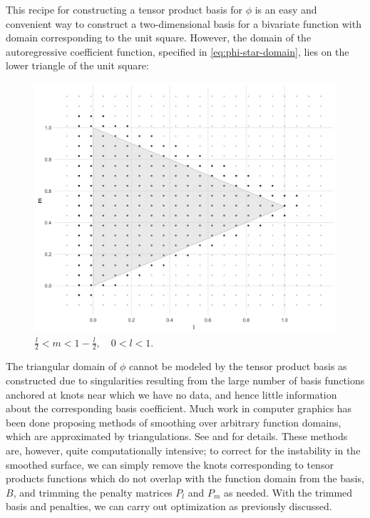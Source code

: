 \documentclass[12pt]{article}
\theoremstyle{definition}
\begin{document}
This recipe for constructing a tensor product basis for $\phi$ is an easy and convenient way to construct a two-dimensional basis for a bivariate function with domain corresponding to the unit square. However, the domain of the autoregressive coefficient function, specified in \ref{eq:phi-star-domain}, lies on the lower triangle of the unit square:

\begin{figure}[H] \label{fig:triangle-domain}
    \graphicspath{{img/}}
 \includegraphics[scale=0.2]{knot-removal-on-triangle-domain.png}
 \caption{$\frac{l}{2} < m < 1 - \frac{l}{2}, \quad 0 < l < 1.$}
 \end{figure}

The triangular domain of $\phi$ cannot be modeled by the tensor product basis as constructed due to singularities resulting from the large number of basis functions anchored at knots near which we have no data, and hence little information about the corresponding basis coefficient. Much work in computer graphics has been done proposing methods of smoothing over arbitrary function domains, which are approximated by triangulations. See \citet{dahmen1992blossoming} and \citet{seidel1991symmetric} for details. These methods are, however, quite computationally intensive; to correct for the instability in the smoothed surface, we can simply remove the knots corresponding to tensor products functions which do not overlap with the function domain from the basis, $B$, and trimming the penalty matrices $P_l$ and $P_m$ as needed. With the trimmed basis and penalties, we can carry out optimization as previously discussed.
\end{document}
